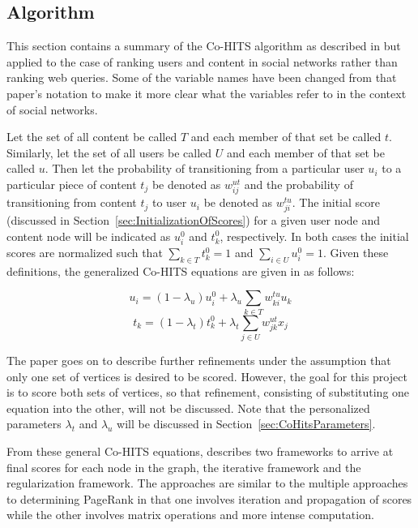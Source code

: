 \subsection{Algorithm}
\label{sec:CoHitsAlgorithm}

This section contains a summary of the Co-HITS algorithm as described in \cite{Deng2009} but applied to the case of ranking users and content in social networks rather than ranking web queries. Some of the variable names have been changed from that paper's notation to make it more clear what the variables refer to in the context of social networks.

Let the set of all content be called $T$ and each member of that set be called $t$. Similarly, let the set of all users be called $U$ and each member of that set be called $u$. Then let the probability of transitioning from a particular user $u_{i}$ to a particular piece of content $t_{j}$ be denoted as $w_{ij}^{ut}$ and the probability of transitioning from content $t_{j}$ to user $u_{i}$ be denoted as $w_{ji}^{tu}$. The initial score (discussed in Section~\ref{sec:InitializationOfScores}) for a given user node and content node will be indicated as $u_{i}^{0}$ and $t_{k}^0$, respectively. In both cases the initial scores are normalized such that $\sum\limits_{k \in T} t_{k}^{0} = 1$ and $\sum\limits_{i \in U} u_{i}^{0} = 1$. Given these definitions, the generalized Co-HITS equations are given in \cite{Deng2009} as follows:

\begin{center}
\[u_{i} = (1 - \lambda_{u}) u_{i}^{0} + \lambda_{u}  \sum\limits_ {k \in T} w_{ki}^{tu} u_{k}\]
\[t_{k} = (1 - \lambda_{t}) t_{k}^{0} + \lambda_{t}  \sum\limits_ {j \in U} w_{jk}^{ut} x_{j}\]
\end{center}

The paper goes on to describe further refinements under the assumption that only one set of vertices is desired to be scored. However, the goal for this project is to score both sets of vertices, so that refinement, consisting of substituting one equation into the other, will not be discussed. Note that the personalized parameters $\lambda_{t}$ and $\lambda_{u}$ will be discussed in Section~\ref{sec:CoHitsParameters}.

From these general Co-HITS equations, \cite{Deng2009} describes two frameworks to arrive at final scores for each node in the graph, the iterative framework and the regularization framework. The approaches are similar to the multiple approaches to determining PageRank in that one involves iteration and propagation of scores while the other involves matrix operations and more intense computation.

